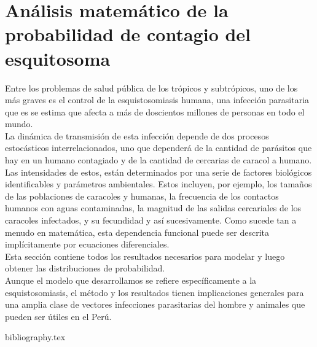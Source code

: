 \documentclass[a4paper,11pt]{book}
\begin{document}
\chapter{Análisis matemático de la probabilidad de contagio del esquitosoma}
Entre los problemas de salud pública de los trópicos y subtrópicos, uno de los más graves es el control de la esquistosomiasis humana, una infección parasitaria que es
se estima que afecta a más de doscientos millones de personas en todo el
mundo.\\
La dinámica de transmisión de esta infección depende de dos procesos estocásticos interrelacionados, uno que dependerá de la cantidad de parásitos que hay en un humano contagiado y de la cantidad de cercarias de caracol a humano.\\
Las intensidades de estos, están determinados por una serie de factores biológicos identificables y parámetros ambientales. Estos incluyen, por ejemplo, los tamaños de las poblaciones de caracoles y humanas, la frecuencia de los contactos humanos con aguas contaminadas, la magnitud de las salidas cercariales de los caracoles infectados, y su fecundidad y así sucesivamente. Como sucede tan a menudo en matemática, esta dependencia funcional puede ser descrita implícitamente por ecuaciones diferenciales.\\
Esta sección contiene todos los resultados necesarios para modelar y luego obtener las distribuciones de probabilidad.\\
Aunque el modelo que desarrollamos se refiere específicamente a la esquistosomiasis, el método y los resultados tienen implicaciones generales para una amplia clase de vectores infecciones parasitarias del hombre y animales que pueden ser útiles en el Perú.\\
    
    
    
    
    

\backmatter

{bibliography.tex}
\end{document}
